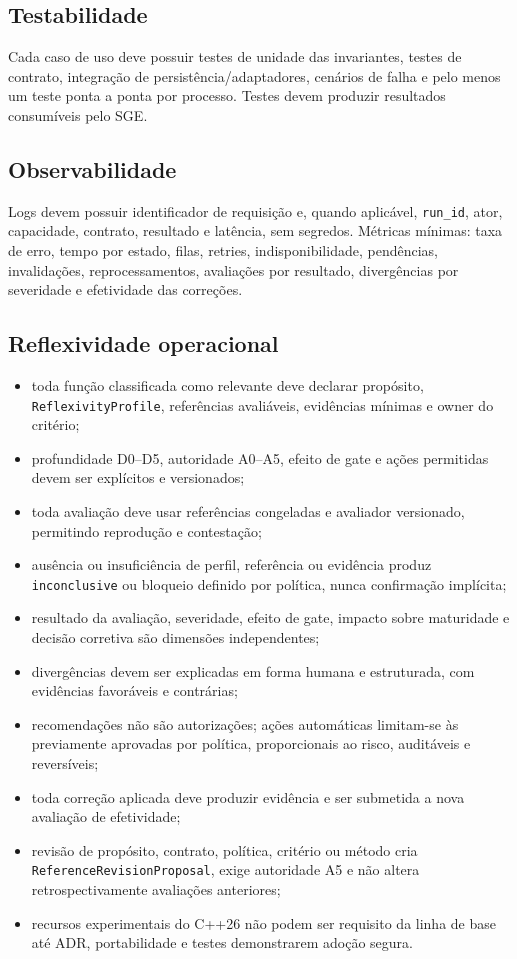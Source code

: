 \documentclass[11pt,a4paper,oneside]{article}
\begin{document}
\subsection{Testabilidade}
Cada caso de uso deve possuir testes de unidade das invariantes, testes de contrato, integração de persistência/adaptadores, cenários de falha e pelo menos um teste ponta a ponta por processo. Testes devem produzir resultados consumíveis pelo SGE.

\subsection{Observabilidade}
Logs devem possuir identificador de requisição e, quando aplicável, \texttt{run\_id}, ator, capacidade, contrato, resultado e latência, sem segredos. Métricas mínimas: taxa de erro, tempo por estado, filas, retries, indisponibilidade, pendências, invalidações, reprocessamentos, avaliações por resultado, divergências por severidade e efetividade das correções.

\subsection{Reflexividade operacional}
\begin{itemize}
  \item toda função classificada como relevante deve declarar propósito, \texttt{ReflexivityProfile}, referências avaliáveis, evidências mínimas e owner do critério;
  \item profundidade D0--D5, autoridade A0--A5, efeito de gate e ações permitidas devem ser explícitos e versionados;
  \item toda avaliação deve usar referências congeladas e avaliador versionado, permitindo reprodução e contestação;
  \item ausência ou insuficiência de perfil, referência ou evidência produz \texttt{inconclusive} ou bloqueio definido por política, nunca confirmação implícita;
  \item resultado da avaliação, severidade, efeito de gate, impacto sobre maturidade e decisão corretiva são dimensões independentes;
  \item divergências devem ser explicadas em forma humana e estruturada, com evidências favoráveis e contrárias;
  \item recomendações não são autorizações; ações automáticas limitam-se às previamente aprovadas por política, proporcionais ao risco, auditáveis e reversíveis;
  \item toda correção aplicada deve produzir evidência e ser submetida a nova avaliação de efetividade;
  \item revisão de propósito, contrato, política, critério ou método cria \texttt{ReferenceRevisionProposal}, exige autoridade A5 e não altera retrospectivamente avaliações anteriores;
  \item recursos experimentais do C++26 não podem ser requisito da linha de base até ADR, portabilidade e testes demonstrarem adoção segura.
\end{itemize}
\end{document}
